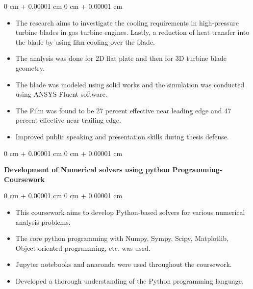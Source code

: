 \documentclass[10pt, letterpaper]{article}
\newenvironment{highlights}{
    \begin{itemize}[
        topsep=0.10 cm,
        parsep=0.10 cm,
        partopsep=0pt,
        itemsep=0pt,
        leftmargin=0 cm + 10pt
    ]
}{
    \end{itemize}
} %
\newenvironment{onecolentry}{
    \begin{adjustwidth}{
        0 cm + 0.00001 cm
    }{
        0 cm + 0.00001 cm
    }
}{
    \end{adjustwidth}
} %
\newenvironment{twocolentry}[2][]{
    \onecolentry
    \def\secondColumn{#2}
    \setcolumnwidth{\fill, 4.5 cm}
    \begin{paracol}{2}
}{
    \switchcolumn \raggedleft \secondColumn
    \end{paracol}
    \endonecolentry
} %
\begin{document}
        \vspace{0.10 cm}
        \begin{onecolentry}
            \begin{highlights}
                \item The research aims to investigate the cooling requirements in high-pressure turbine blades in gas turbine engines. Lastly, a reduction of heat transfer into the blade by using film cooling over the blade.
                \item The analysis was done for 2D flat plate and then for 3D turbine blade geometry.
                \item The blade was modeled using solid works and the simulation was conducted using ANSYS Fluent software.
                \item The Film was found to be 27 percent effective near leading edge and 47 percent effective near trailing edge.
                \item Improved public speaking and presentation skills during thesis defense.
            \end{highlights}
        \end{onecolentry}


        \vspace{0.2 cm}

        \begin{twocolentry}{
            2022
        }
            \textbf{Development of Numerical solvers using python Programming- Coursework}\end{twocolentry}

        \vspace{0.10 cm}
        \begin{onecolentry}
            \begin{highlights}
                \item This coursework aims to develop Python-based solvers for various numerical analysis problems.
                \item The core python programming with Numpy, Sympy, Scipy, Matplotlib, Object-oriented programming, etc. was used.
                \item Jupyter notebooks and anaconda were used throughout the coursework.
                \item Developed a thorough understanding of the Python programming language.
            \end{highlights}
        \end{onecolentry}
\end{document}
